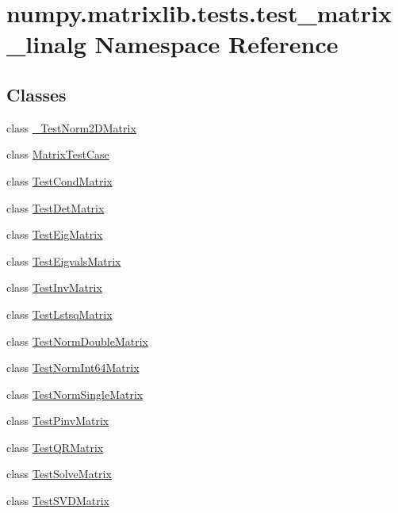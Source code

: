 \hypertarget{namespacenumpy_1_1matrixlib_1_1tests_1_1test__matrix__linalg}{}\section{numpy.\+matrixlib.\+tests.\+test\+\_\+matrix\+\_\+linalg Namespace Reference}
\label{namespacenumpy_1_1matrixlib_1_1tests_1_1test__matrix__linalg}
\subsection*{Classes}
\begin{DoxyCompactItemize}
\item 
class \hyperlink{classnumpy_1_1matrixlib_1_1tests_1_1test__matrix__linalg_1_1__TestNorm2DMatrix}{\+\_\+\+Test\+Norm2\+D\+Matrix}
\item 
class \hyperlink{classnumpy_1_1matrixlib_1_1tests_1_1test__matrix__linalg_1_1MatrixTestCase}{Matrix\+Test\+Case}
\item 
class \hyperlink{classnumpy_1_1matrixlib_1_1tests_1_1test__matrix__linalg_1_1TestCondMatrix}{Test\+Cond\+Matrix}
\item 
class \hyperlink{classnumpy_1_1matrixlib_1_1tests_1_1test__matrix__linalg_1_1TestDetMatrix}{Test\+Det\+Matrix}
\item 
class \hyperlink{classnumpy_1_1matrixlib_1_1tests_1_1test__matrix__linalg_1_1TestEigMatrix}{Test\+Eig\+Matrix}
\item 
class \hyperlink{classnumpy_1_1matrixlib_1_1tests_1_1test__matrix__linalg_1_1TestEigvalsMatrix}{Test\+Eigvals\+Matrix}
\item 
class \hyperlink{classnumpy_1_1matrixlib_1_1tests_1_1test__matrix__linalg_1_1TestInvMatrix}{Test\+Inv\+Matrix}
\item 
class \hyperlink{classnumpy_1_1matrixlib_1_1tests_1_1test__matrix__linalg_1_1TestLstsqMatrix}{Test\+Lstsq\+Matrix}
\item 
class \hyperlink{classnumpy_1_1matrixlib_1_1tests_1_1test__matrix__linalg_1_1TestNormDoubleMatrix}{Test\+Norm\+Double\+Matrix}
\item 
class \hyperlink{classnumpy_1_1matrixlib_1_1tests_1_1test__matrix__linalg_1_1TestNormInt64Matrix}{Test\+Norm\+Int64\+Matrix}
\item 
class \hyperlink{classnumpy_1_1matrixlib_1_1tests_1_1test__matrix__linalg_1_1TestNormSingleMatrix}{Test\+Norm\+Single\+Matrix}
\item 
class \hyperlink{classnumpy_1_1matrixlib_1_1tests_1_1test__matrix__linalg_1_1TestPinvMatrix}{Test\+Pinv\+Matrix}
\item 
class \hyperlink{classnumpy_1_1matrixlib_1_1tests_1_1test__matrix__linalg_1_1TestQRMatrix}{Test\+Q\+R\+Matrix}
\item 
class \hyperlink{classnumpy_1_1matrixlib_1_1tests_1_1test__matrix__linalg_1_1TestSolveMatrix}{Test\+Solve\+Matrix}
\item 
class \hyperlink{classnumpy_1_1matrixlib_1_1tests_1_1test__matrix__linalg_1_1TestSVDMatrix}{Test\+S\+V\+D\+Matrix}
\end{DoxyCompactItemize}
